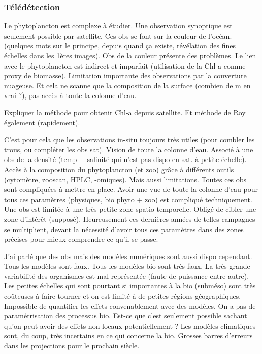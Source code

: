 \subsubsection{Télédétection}
\label{sec:teledetection}

Le phytoplancton est complexe à étudier.
Une observation synoptique est seulement possible par satellite.
Ces obs se font sur la couleur de l'océan. (quelques mots sur le principe, depuis quand ça existe, révélation des fines échelles dans les 1ères images).
Obs de la couleur présente des problèmes. Le lien avec le phytoplancton est indirect et imparfait (utilisation de la Chl-a comme proxy de biomasse). Limitation importante des observations par la couverture nuageuse. Et cela ne scanne que la composition de la surface (combien de m en vrai ?), pas accès à toute la colonne d'eau.

Expliquer la méthode pour obtenir Chl-a depuis satellite. Et méthode de Roy également (rapidement).

C'est pour cela que les observations in-situ toujours très utiles (pour combler les trous, ou compléter les obs sat). Vision de toute la colonne d'eau. Associé à une obs de la densité (temp + salinité qui n'est pas dispo en sat. à petite échelle).
Accès à la composition du phytoplancton (et zoo) grâce à différents outils (cytomètre, zooscan, HPLC, -omiques).
Mais aussi limitations. Toutes ces obs sont compliquées à mettre en place. Avoir une vue de toute la colonne d'eau pour tous ces paramètres (physiques, bio phyto + zoo) est compliqué techniquement. Une obs est limitée à une très petite zone spatio-temporelle. Obligé de cibler une zone d'intérêt (supposé).
Heureusement ces dernières années de telles campagnes se multiplient, devant la nécessité d'avoir tous ces paramètres dans des zones précises pour mieux comprendre ce qu'il se passe.

J'ai parlé que des obs mais des modèles numériques sont aussi dispo cependant.
Tous les modèles sont faux. Tous les modèles bio sont très faux.
La très grande variabilité des organismes est mal représentée (faute de puissance entre autre). Les petites échelles qui sont pourtant si importantes à la bio (subméso) sont très coûteuses à faire tourner et on est limité à de petites régions géographiques. Impossible de quantifier les effets convenablement avec des modèles.
On a pas de paramétrisation des processus bio. Est-ce que c'est seulement possible sachant qu'on peut avoir des effets non-locaux potentiellement ?
Les modèles climatiques sont, du coup, très incertains en ce qui concerne la bio.
Grosses barres d'erreurs dans les projections pour le prochain siècle.

